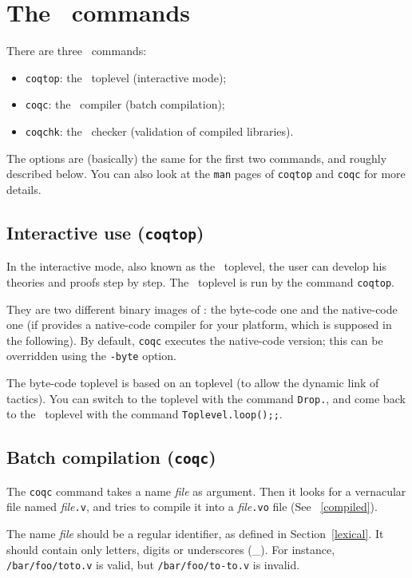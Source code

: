 \chapter[The \Coq~commands]{The \Coq~commands\label{Addoc-coqc}
}

There are three \Coq~commands: 
\begin{itemize}
\item {\tt coqtop}: the \Coq\ toplevel (interactive mode);
\item {\tt coqc}: the \Coq\ compiler (batch compilation);
\item {\tt coqchk}: the \Coq\ checker (validation of compiled libraries).
\end{itemize}
The options are (basically) the same for the first two commands, and
roughly described below. You can also look at the \verb!man! pages of
\verb!coqtop! and \verb!coqc! for more details.


\section{Interactive use ({\tt coqtop})}

In the interactive mode, also known as the \Coq~toplevel, the user can
develop his theories and proofs step by step.  The \Coq~toplevel is
run by the command {\tt coqtop}. 

\label{binary-images}
They are two different binary images of \Coq: the byte-code one and
the native-code one (if {\ocaml} provides a native-code compiler
for your platform, which is supposed in the following). By default,
\verb!coqc! executes the native-code version; this can be overridden
using the \verb!-byte! option.

The byte-code toplevel is based on an {\ocaml}
toplevel (to allow the dynamic link of tactics).  You can switch to
the {\ocaml} toplevel with the command \verb!Drop.!, and come back to the
\Coq~toplevel with the command \verb!Toplevel.loop();;!.

\section{Batch compilation ({\tt coqc})}
The {\tt coqc} command takes a name {\em file} as argument.  Then it
looks for a vernacular file named {\em file}{\tt .v}, and tries to
compile it into a {\em file}{\tt .vo} file (See ~\ref{compiled}).

\Warning The name {\em file} should be a regular {\Coq} identifier, as
defined in Section~\ref{lexical}. It should contain only letters, digits
or underscores (\_). For instance, \verb+/bar/foo/toto.v+ is valid, but
\verb+/bar/foo/to-to.v+ is invalid.


